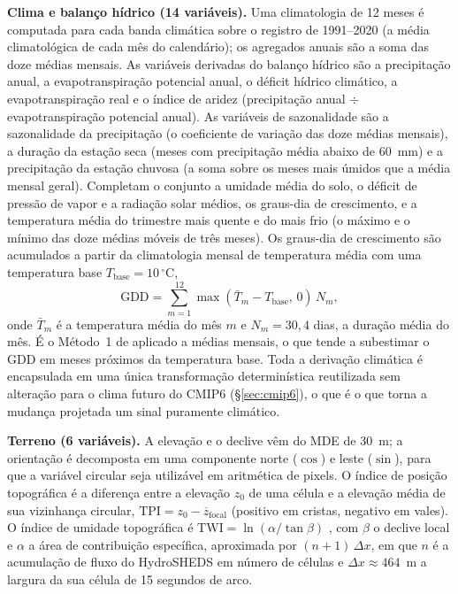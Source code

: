 \textbf{Clima e balanço hídrico (14 variáveis).} Uma climatologia de 12 meses é computada
para cada banda climática sobre o registro de 1991--2020 (a média climatológica de cada mês
do calendário); os agregados anuais são a soma das doze médias mensais. As variáveis
derivadas do balanço hídrico são a precipitação anual, a evapotranspiração potencial anual, o
déficit hídrico climático, a evapotranspiração real e o índice de aridez (precipitação anual
$\div$ evapotranspiração potencial anual). As variáveis de sazonalidade são a sazonalidade da
precipitação (o coeficiente de variação das doze médias mensais), a duração da estação seca
(meses com precipitação média abaixo de 60~mm) e a precipitação da estação chuvosa (a soma
sobre os meses mais úmidos que a média mensal geral). Completam o conjunto a umidade média do
solo, o déficit de pressão de vapor e a radiação solar médios, os graus-dia de crescimento, e
a temperatura média do trimestre mais quente e do mais frio (o máximo e o mínimo das doze
médias móveis de três meses). Os graus-dia de
crescimento são acumulados a partir da climatologia mensal de temperatura média com uma
temperatura base $T_{\text{base}} = 10\,^\circ\mathrm{C}$,
\begin{equation*}
  \mathrm{GDD} = \sum_{m=1}^{12} \max\!\left(\bar{T}_m - T_{\text{base}},\, 0\right)\, N_m,
\end{equation*}
onde $\bar{T}_m$ é a temperatura média do mês $m$ e $N_m = 30{,}4$ dias, a duração média do mês. É o
Método~1 de \citet[p.~292]{mcmaster_growing_1997} aplicado a médias mensais, o que tende a
subestimar o GDD em meses próximos da temperatura base. Toda a
derivação climática é encapsulada em uma única transformação determinística reutilizada sem
alteração para o clima futuro do CMIP6 (\S\ref{sec:cmip6}), o que é o que torna a mudança
projetada um sinal puramente climático.

\textbf{Terreno (6 variáveis).} A elevação e o declive vêm do MDE de 30~m; a orientação é
decomposta em uma componente norte ($\cos$) e leste ($\sin$), para que a variável circular
seja utilizável em aritmética de pixels. O índice de posição topográfica é a diferença entre
a elevação $z_0$ de uma célula e a elevação média de sua vizinhança circular,
$\mathrm{TPI} = z_0 - \overline{z}_{\text{focal}}$ (positivo em cristas, negativo em vales). O
índice de umidade topográfica é $\mathrm{TWI} = \ln(\alpha / \tan\beta)$
\citep[p.~48, eq.~8]{beven_physically_1979}, com $\beta$ o declive local e $\alpha$ a área de
contribuição específica, aproximada por $(n+1)\,\Delta x$, em que $n$ é a acumulação de fluxo do
HydroSHEDS em número de células e $\Delta x \approx 464$~m a largura da sua célula de 15 segundos de
arco.

